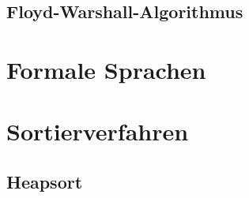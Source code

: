 \documentclass[german]{../spicker}
\begin{document}
\subsection{Floyd-Warshall-Algorithmus}

\section{Formale Sprachen}




\section{Sortierverfahren}
\subsection{Heapsort}
\end{document}
